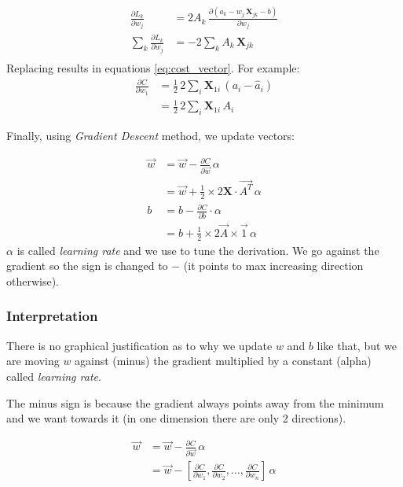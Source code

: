 \begin{align*}
  \frac{\partial L_k}{\partial w_j} &= 2A_k\,\frac{\partial(a_k - w_j\,\mathbf{X}_{jk} - b)}{\partial w_j}\\
\sum_k \frac{\partial L_k}{\partial w_j} &= -2\sum_k A_k\,\mathbf{X}_{jk}\\
\end{align*}
Replacing results in equations \ref{eq:cost_vector}. For example: 
\begin{align*}
  \frac{\partial C}{\partial w_1} &= \frac{1}{2}\, 2\sum_i \mathbf{X}_{1i}\,(a_i-\hat{a}_i) \\
  &= \frac{1}{2}\, 2\sum_i \mathbf{X}_{1i}\,A_i 
\end{align*}

Finally, using \textit{Gradient Descent} method, we update vectors:

\begin{align}
  \vec{w} &= \vec{w} -\frac{\partial C}{\partial \vec{w}}\,\alpha\nonumber\\
  &= \vec{w} +\frac{1}{2}\times{}2\mathbf{X}\cdot{}\vec{A^T}\,\alpha\\ 
  b &= b -\frac{\partial C}{\partial b}\cdot{}\alpha\nonumber\\
  &= b +\frac{1}{2}\times{}2\vec{A}\times{}\vec{1}\,\alpha
\end{align}
$\alpha$ is called \textit{learning rate} and we use to tune the derivation. We go against the gradient so the sign is changed to $-$ (it points to max increasing direction otherwise).

\subsubsection{Interpretation}

There is no graphical justification as to why we update $w$ and $b$ like that, but we are moving $w$ against (minus) the gradient multiplied by a constant (alpha) called \textit{learning rate}.

The minus sign is because the gradient always points away from the minimum and we want towards it (in one dimension there are only 2 directions). 

\begin{align}
  \vec{w} &= \vec{w} -\frac{\partial C}{\partial \vec{w}}\,\alpha\\
  &= \vec{w} -\left[\frac{\partial C}{\partial w_1}, \frac{\partial C}{\partial w_2},\ldots, \frac{\partial C}{\partial w_n}\right]\,\alpha
\end{align}

